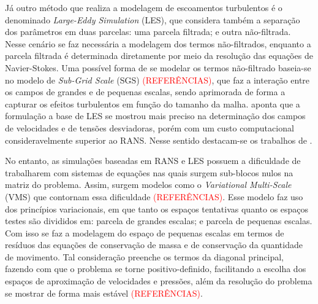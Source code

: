 \documentclass[_ArquivoPrincipal.tex]{subfiles}
\begin{document}
Já outro método que realiza a modelagem de escoamentos turbulentos é o denominado \textit{Large-Eddy Simulation} (LES), que considera também a separação dos parâmetros em duas parcelas: uma parcela filtrada; e outra não-filtrada. Nesse cenário se faz necessária a modelagem dos termos não-filtrados, enquanto a parcela filtrada é determinada diretamente por meio da resolução das equações de Navier-Stokes. Uma possível forma de se modelar os termos não-filtrado baseia-se no modelo de \textit{Sub-Grid Scale} (SGS) \textcolor{red}{(REFERÊNCIAS)}, que faz a interação entre os campos de grandes e de pequenas escalas, sendo aprimorada de forma a capturar os efeitos turbulentos em função do tamanho da malha.
 aponta que a formulação a base de LES se mostrou mais preciso na determinação dos campos de velocidades e de tensões desviadoras, porém com um custo computacional consideravelmente superior ao RANS. Nesse sentido destacam-se os trabalhos de .

No entanto, as simulações baseadas em RANS e LES possuem a dificuldade de trabalharem com sistemas de equações nas quais surgem sub-blocos nulos na matriz do problema. Assim, surgem modelos como o \textit{Variational Multi-Scale} (VMS) que contornam essa dificuldade \textcolor{red}{(REFERÊNCIAS)}. Esse modelo faz uso dos princípios variacionais, em que tanto os espaços tentativas quanto os espaços testes são divididos em: parcela de grandes escalas; e parcela de pequenas escalas. Com isso se faz a modelagem do espaço de pequenas escalas em termos de resíduos das equações de conservação de massa e de conservação da quantidade de movimento. Tal consideração preenche os termos da diagonal principal, fazendo com que o problema se torne positivo-definido, facilitando a escolha dos espaços de aproximação de velocidades e pressões, além da resolução do problema se mostrar de forma mais estável \textcolor{red}{(REFERÊNCIAS)}.
\end{document}
